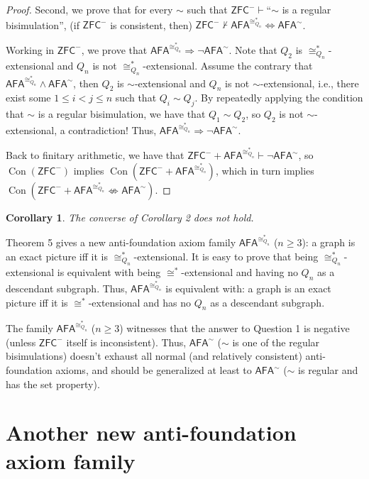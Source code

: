 \documentclass{amsart}
\newcommand{\ZFC}{\mathsf{ZFC}}
\newcommand{\zfc}{\mathsf{ZFC}}
\newcommand{\AFA}{\mathsf{AFA}}
\newcommand{\afa}{\mathsf{AFA}}
\DeclareMathOperator{\con}{Con}
\newtheorem{corollary}{Corollary}
\begin{document}
\begin{proof}
    Second, we prove that for every $\sim$ such that $\zfc^-\vdash$``$\sim$ is a regular bisimulation'', (if $\zfc^-$ is consistent, then) $\zfc^-\not\vdash\afa^{\cong_{Q_n}^*}\Leftrightarrow\afa^{\sim}$.
    
    Working in $\zfc^-$, we prove that $\afa^{\cong_{Q_n}^*}\Rightarrow\neg\afa^\sim$. Note that $Q_2$ is $\cong_{Q_n}^*$-extensional and $Q_n$ is not $\cong_{Q_n}^*$-extensional.
    Assume the contrary that $\afa^{\cong_{Q_n}^*}\land\afa^\sim$, then $Q_2$ is $\sim$-extensional and $Q_n$ is not $\sim$-extensional, i.e., there exist some $1\leq i<j\leq n$ such that $Q_i\sim Q_j$. By repeatedly applying the condition that $\sim$ is a regular bisimulation, we have that $Q_1\sim Q_2$, so $Q_2$ is not $\sim$-extensional, a contradiction! Thus, $\afa^{\cong_{Q_n}^*}\Rightarrow\neg\afa^\sim$.
    
    Back to finitary arithmetic, we have that $\zfc^-+\afa^{\cong_{Q_n}^*}\vdash\neg\afa^\sim$, so $\con(\zfc^-)$ implies $\con(\zfc^-+\afa^{\cong_{Q_n}^*})$, which in turn implies $\con(\zfc^-+\afa^{\cong_{Q_n}^*}\not\Leftrightarrow\afa^{\sim})$.
\end{proof}

\begin{corollary}
    The converse of Corollary 2 does not hold.
\end{corollary}

Theorem 5 gives a new anti-foundation axiom family $\afa^{\cong_{Q_n}^*}$ ($n\geq3$): a graph is an exact picture iff it is $\cong_{Q_n}^*$-extensional. It is easy to prove that being $\cong_{Q_n}^*$-extensional is equivalent with being $\cong^*$-extensional and having no $Q_n$ as a descendant subgraph. Thus, $\afa^{\cong_{Q_n}^*}$ is equivalent with: a graph is an exact picture iff it is $\cong^*$-extensional and has no $Q_n$ as a descendant subgraph.

The family $\afa^{\cong_{Q_n}^*}$ ($n\geq3$) witnesses that the answer to Question 1 is negative (unless $\ZFC^-$ itself is inconsistent). Thus, $\AFA^\sim$ ($\sim$ is one of the regular bisimulations) doesn't exhaust all normal (and relatively consistent) anti-foundation axioms, and should be generalized at least to $\AFA^\sim$ ($\sim$ is regular and has the set property).

\section{Another new anti-foundation axiom family}
\end{document}
